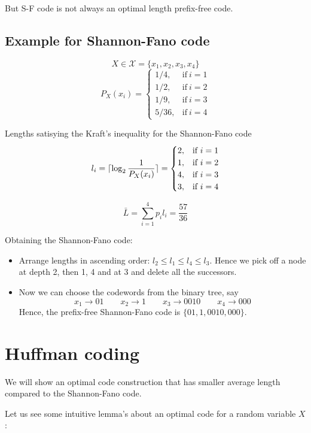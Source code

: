 \documentclass{article}
\DeclarePairedDelimiter{\ceil}{\lceil}{\rceil}
\begin{document}
But S-F code is not always an optimal length prefix-free code.

\subsection{Example for Shannon-Fano code}
$$ X \in \mathcal{X}= \{ x_1,x_2,x_3,x_4 \}$$
\begin{equation*}
        P_X (x_i)=
        \begin{cases}
          1/4, & \text{if}\ i=1 \\
          1/2, & \text{if}\ i=2 \\
          1/9, & \text{if}\ i=3 \\
          5/36, & \text{if}\ i=4
        \end{cases}
    \end{equation*}

Lengths satisying the Kraft's inequality for the Shannon-Fano code
$$ l_i= \ceil{\log_2 \frac{1}{P_X (x_i)}}= \begin{cases}
  2, & \text{if}\ i=1 \\
  1, & \text{if}\ i=2 \\
  4, & \text{if}\ i=3 \\
  3, & \text{if}\ i=4
\end{cases} $$

$$ \bar{L}= \sum_{i=1}^{4} p_i l_i = \frac{57}{36}$$

Obtaining the Shannon-Fano code:
\begin{itemize}
    \item Arrange lengths in ascending order: $l_2 \leq l_1 \leq l_4 \leq l_3$. Hence we pick off a node at depth 2, then 1, 4 and at 3 and delete all the successors.

    \item Now we can choose the codewords from the binary tree, say
    $$ x_1 \to 01 \qquad x_2 \to 1 \qquad x_3 \to 0010 \qquad x_4 \to 000$$
    Hence, the prefix-free Shannon-Fano code is $\{ 01,1,0010,000\} $.
\end{itemize}

\section{Huffman coding}
We will show an optimal code construction that has smaller average length compared to the Shannon-Fano code.

Let us see some intuitive lemma's about an optimal code for a random variable $X$:
\end{document}
